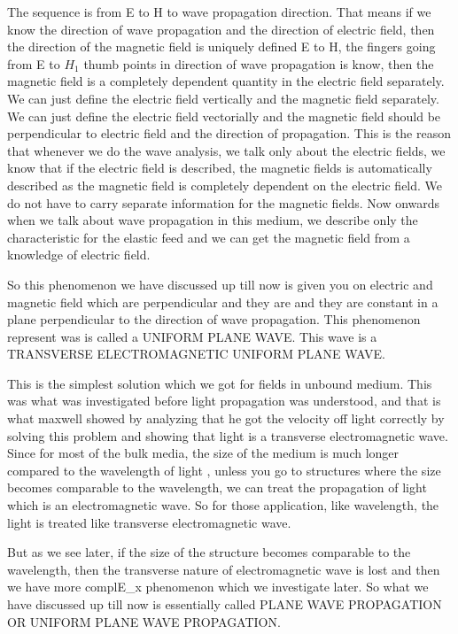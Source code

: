 The sequence is from E to H to wave propagation direction. That means if we know the direction of wave propagation and the direction of electric field, then the direction of the magnetic field is uniquely defined E to H, the fingers going from E to $H_{1}$ thumb points in direction of wave propagation is know, then the magnetic field is a completely dependent quantity in the electric field separately. We can just define the electric field vertically and the magnetic field separately. We can just define the electric field vectorially and the magnetic field should be perpendicular to electric field and the direction of propagation. This is the reason that whenever we do the wave analysis, we talk only about the electric fields, we know that if the electric field is described, the magnetic fields is automatically described as the magnetic field is completely dependent on the electric field. We do not have to carry separate information for the magnetic fields. Now onwards when we talk about wave propagation in this medium, we describe only the characteristic for the elastic feed and we can get the magnetic field from a knowledge of electric field.

So this phenomenon we have discussed up till now is given you on electric and magnetic field which are perpendicular and they are and they are constant in a plane perpendicular to the direction of wave propagation. This phenomenon represent was is called a UNIFORM PLANE WAVE. This wave is a TRANSVERSE ELECTROMAGNETIC UNIFORM PLANE WAVE.

This is the simplest solution which we got for fields in unbound medium. This was what was investigated before light propagation was understood, and that is what maxwell showed by analyzing that he got the velocity off light correctly by solving this problem and showing that light is a transverse electromagnetic wave. Since for most of the bulk media, the size of the medium is much longer compared to the wavelength of light , unless you go to structures where the size becomes comparable to the wavelength, we can treat the propagation of light which is an electromagnetic wave. So for those application, like wavelength, the light is treated like transverse electromagnetic wave. 

But as we see later, if the size of the structure becomes comparable to the wavelength, then the transverse nature of electromagnetic wave is lost and then we have more complE_x phenomenon which we investigate later. So what we have discussed up till now is essentially called PLANE WAVE PROPAGATION OR UNIFORM PLANE WAVE PROPAGATION.

